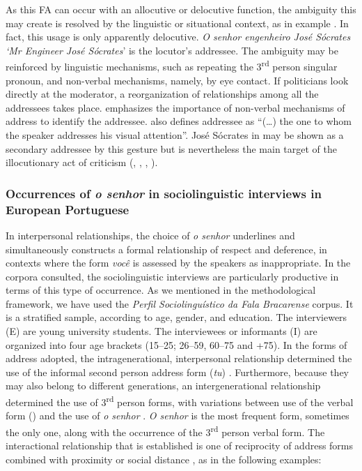 \documentclass[output=paper]{langscibook}
\begin{document}
As this FA can occur with an allocutive or delocutive function, the ambiguity this may create is resolved by the linguistic or situational context, as in example . In fact, this usage is only apparently delocutive. \textit{O senhor engenheiro José Sócrates ‘Mr Engineer José Sócrates}’ is the locutor’s  addressee. The ambiguity may be reinforced by linguistic mechanisms, such as repeating the 3\textsuperscript{rd} person singular pronoun, and non-verbal mechanisms, namely, by eye contact. If politicians look directly at the moderator, a reorganization of relationships among all the addressees takes place. \citet[109]{Kerbrat-Orecchioni2010} emphasizes the importance of non-verbal mechanisms of address to identify the addressee. \citet[133]{Goffman1981} also defines addressee as “(…) the one to whom the speaker addresses his visual attention”. José Sócrates in  may be shown as a secondary addressee by this gesture but is nevertheless the main target of the illocutionary act of criticism (\citealt{Goffman1981}, \citealt{Maury-Rouan2005}, \citealt{Rossano2013}, \citealt{ConstantindeChanayKerbrat-Orecchioni2017}).



\subsubsection{Occurrences of \textit{o senhor} in sociolinguistic {interviews} {in} {European} {Portuguese}}\label{sec:marques:4.2.1}



In interpersonal relationships, the choice of \textit{o senhor} underlines and simultaneously constructs a formal relationship of respect and deference, in contexts where the form \textit{você} is assessed by the speakers as inappropriate. In the corpora consulted, the sociolinguistic interviews are particularly productive in terms of this type of occurrence. As we mentioned in the methodological framework, we have used the \textit{Perfil Sociolinguístico da Fala Bracarense} corpus. It is a stratified sample, according to age, gender, and education. The interviewers (E) are young university students. The interviewees or informants (I) are organized into four age brackets (15–25; 26–59, 60–75 and +75). In the forms of address adopted, the intragenerational, interpersonal relationship determined the use of the informal second person address form (\textit{tu}) . Furthermore, because they may also belong to different generations, an intergenerational relationship determined the use of 3\textsuperscript{rd} person forms, with variations between use of the verbal form () and the use of \textit{o senhor} . \textit{O senhor} is the most frequent form, sometimes the only one, along with the occurrence of the 3\textsuperscript{rd} person verbal form. The interactional relationship that is established is one of reciprocity of address forms combined with proximity  or social distance , as in the following examples:\largerpage[2]
\end{document}
